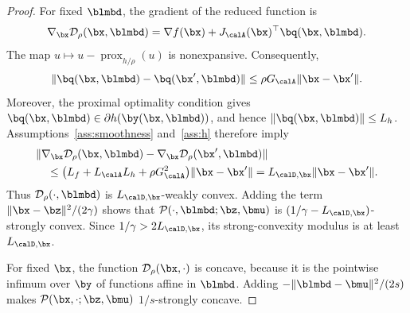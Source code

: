 
\begin{proof}
For fixed $\blmbd$, the gradient of the reduced function is
\begin{equation}
    \nabla_{\bx}\mathcal D_\rho(\bx,\blmbd)
    =
    \nabla f(\bx)
    +J_{\calA}(\bx)^\top\bq(\bx,\blmbd).
    \label{eq:reduced-x-gradient}
\end{equation}
The map $u\mapsto u-\operatorname{prox}_{h/\rho}(u)$ is nonexpansive.
Consequently,
\begin{equation}
    \|\bq(\bx,\blmbd)-\bq(\bx',\blmbd)\|
    \le
    \rho G_{\calA}\|\bx-\bx'\|.
    \label{eq:q-lipschitz}
\end{equation}
Moreover, the proximal optimality condition gives
$\bq(\bx,\blmbd)\in\partial h(\by(\bx,\blmbd))$, and hence
$\|\bq(\bx,\blmbd)\|\le L_h$.  Assumptions~\ref{ass:smoothness}
and~\ref{ass:h} therefore imply
\begin{equation}
\begin{aligned}
    &\|\nabla_{\bx}\mathcal D_\rho(\bx,\blmbd)
       -\nabla_{\bx}\mathcal D_\rho(\bx',\blmbd)\| \\
    &\quad\le
    \bigl(L_f+L_{\calA}L_h+\rho G_{\calA}^2\bigr)
    \|\bx-\bx'\|
    =L_{\calD,\bx}\|\bx-\bx'\|.
\end{aligned}
\label{eq:reduced-gradient-lipschitz}
\end{equation}
Thus $\mathcal D_\rho(\cdot,\blmbd)$ is
$L_{\calD,\bx}$-weakly convex.  Adding the term
$\|\bx-\bz\|^2/(2\gamma)$ shows that
$\mathcal P(\cdot,\blmbd;\bz,\bmu)$ is
$(1/\gamma-L_{\calD,\bx})$-strongly convex.  Since
$1/\gamma>2L_{\calD,\bx}$, its strong-convexity modulus is at least
$L_{\calD,\bx}$.

For fixed $\bx$, the function $\mathcal D_\rho(\bx,\cdot)$ is concave,
because it is the pointwise infimum over $\by$ of functions affine in
$\blmbd$.  Adding
$-\|\blmbd-\bmu\|^2/(2s)$ makes
$\mathcal P(\bx,\cdot;\bz,\bmu)$ $1/s$-strongly concave.
\end{proof}


